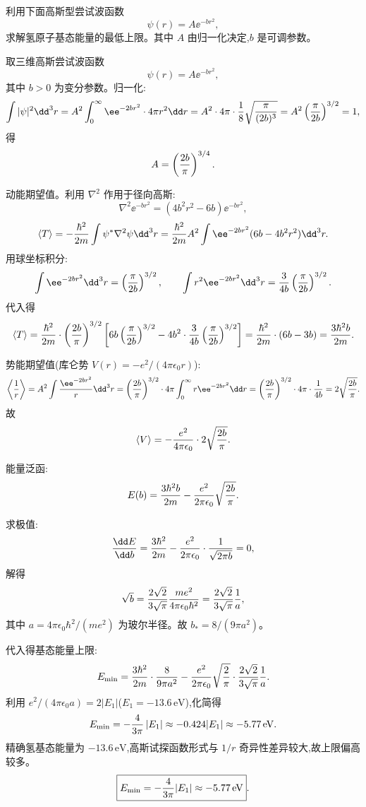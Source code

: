 \begin{question}
利用下面高斯型尝试波函数
\[
\psi(r)=A\ee^{-br^2},
\]
求解氢原子基态能量的最低上限。其中 $A$ 由归一化决定,$b$ 是可调参数。
\begin{solution}
取三维高斯尝试波函数
\[
\psi(r)=A \ee^{-b r^2},
\]
其中 $b>0$ 为变分参数。归一化:
\[
\int|\psi|^2\dd^3r=A^2\int_0^\infty \ee^{-2br^2}\cdot4\pi r^2\dd r
=A^2\cdot4\pi\cdot{1\over8}\sqrt{\pi\over(2b)^3}
=A^2\left({\pi\over2b}\right)^{3/2}=1,
\]
得
\[
A=\left({2b\over\pi}\right)^{3/4}.
\]

动能期望值。利用 $\nabla^2$ 作用于径向高斯:
\[
\nabla^2 \ee^{-br^2}=\left(4b^2r^2-6b\right)\ee^{-br^2},
\]
\[
\langle T\rangle=-{\hbar^2\over2m}\int\psi^*\nabla^2\psi\dd^3r
={\hbar^2\over2m}A^2\int \ee^{-2br^2}(6b-4b^2r^2)\dd^3r.
\]
用球坐标积分:
\[
\int \ee^{-2br^2}\dd^3r=\left({\pi\over2b}\right)^{3/2},\qquad
\int r^2 \ee^{-2br^2}\dd^3r={3\over4b}\left({\pi\over2b}\right)^{3/2}.
\]
代入得
\[
\langle T\rangle={\hbar^2\over2m}\cdot\left({2b\over\pi}\right)^{3/2}
\left[6b\left({\pi\over2b}\right)^{3/2}-4b^2\cdot{3\over4b}\left({\pi\over2b}\right)^{3/2}\right]
={\hbar^2\over2m}\cdot(6b-3b)={3\hbar^2b\over2m}.
\]

势能期望值(库仑势 $V(r)=-e^2/(4\pi\epsilon_0 r)$):
\[
\left\langle{1\over r}\right\rangle=A^2\int{\ee^{-2br^2}\over r}\dd^3r
=\left({2b\over\pi}\right)^{3/2}\cdot4\pi\int_0^\infty r \ee^{-2br^2}\dd r
=\left({2b\over\pi}\right)^{3/2}\cdot4\pi\cdot{1\over4b}
=2\sqrt{2b\over\pi}.
\]
故
\[
\langle V\rangle=-{e^2\over4\pi\epsilon_0}\cdot2\sqrt{2b\over\pi}.
\]

能量泛函:
\[
E(b)={3\hbar^2b\over2m}-{e^2\over2\pi\epsilon_0}\sqrt{2b\over\pi}.
\]

求极值:
\[
{\dd E\over\dd b}={3\hbar^2\over2m}-{e^2\over2\pi\epsilon_0}\cdot{1\over\sqrt{2\pi b}}=0,
\]
解得
\[
\sqrt b={2\sqrt2\over3\sqrt\pi}{me^2\over4\pi\epsilon_0\hbar^2}={2\sqrt2\over3\sqrt\pi}{1\over a},
\]
其中 $a=4\pi\epsilon_0\hbar^2/(me^2)$ 为玻尔半径。故 $b_*=8/(9\pi a^2)$。

代入得基态能量上限:
\[
E_{\min}={3\hbar^2\over2m}\cdot{8\over9\pi a^2}-{e^2\over2\pi\epsilon_0}\sqrt{2\over\pi}\cdot{2\sqrt2\over3\sqrt\pi}{1\over a}.
\]
利用 $e^2/(4\pi\epsilon_0 a)=2|E_1|$($E_1=-13.6\,\mathrm{eV}$),化简得
\[
E_{\min}=-{4\over3\pi}\,|E_1|\approx-0.424|E_1|\approx-5.77\,\mathrm{eV}.
\]
精确氢基态能量为 $-13.6\,\mathrm{eV}$,高斯试探函数形式与 $1/r$ 奇异性差异较大,故上限偏高较多。
\[
\boxed{E_{\min}=-{4\over3\pi}|E_1|\approx-5.77\,\mathrm{eV}}.
\]
\end{solution}
\end{question}

